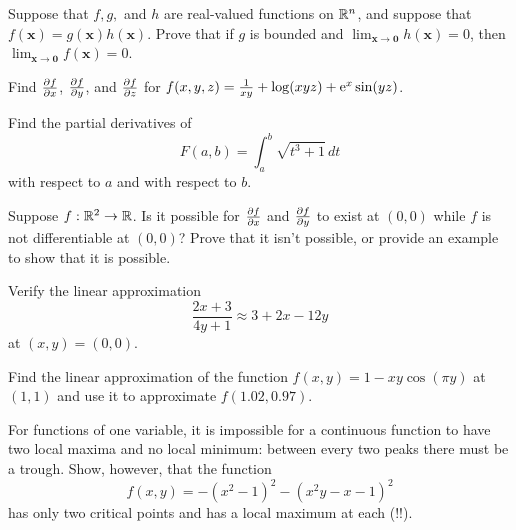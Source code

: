 \documentclass{watsonbook}
\begin{document}
\begin{aexercise}
  Suppose that $f,g,$ and $h$ are real-valued functions on $\mathbb{R}^n$, and
  suppose that $f(\mathbf{x}) = g(\mathbf{x})h(\mathbf{x})$. Prove
  that if $g$ is bounded and
  $\lim_{\mathbf{x}\to \mathbf{0}}h(\mathbf{x}) = 0$, then
  $\lim_{\mathbf{x}\to \mathbf{0}}f(\mathbf{x}) = 0$.
\end{aexercise}


\begin{aexercise}
  Find $\frac{\partial f}{\partial x}$, $\frac{\partial f}{\partial y}$, and $\frac{\partial f}{\partial z}$ for
  $f(x,y,z) = \frac{1}{xy} + \log(xyz) + \operatorname{e}^x\sin(y z) $.
\end{aexercise}

\begin{aexercise}
  Find the partial derivatives of
  \[
    F(a,b) = \int_a^b \sqrt{t^3+1}\,dt
  \]
  with respect to $a$ and with respect to $b$.
\end{aexercise}

\begin{aexercise}
  Suppose $f:\mathbb{R}^2 \to \mathbb{R}$. Is it possible for $\frac{\partial f}{\partial x}$ and
  $\frac{\partial f}{\partial y}$ to exist at $(0,0)$ while $f$ is not differentiable at
  $(0,0)$?  Prove that it isn't possible, or provide an example to
  show that it is possible.
\end{aexercise}


\begin{aexercise}
  Verify the linear approximation
  \[
    \frac{2x+3}{4y+1} \approx 3 + 2x - 12y
  \]
  at $(x,y) = (0,0)$.
\end{aexercise}

\begin{aexercise}
  Find the linear approximation of the function
  $f(x,y) = 1-xy\cos(\pi y)$ at $(1,1)$ and use it to approximate
  $f(1.02,0.97)$.
\end{aexercise}


\begin{aexercise}
  For functions of one variable, it is impossible for a continuous
  function to have two local maxima and no local minimum: between
  every two peaks there must be a trough. Show, however, that the
  function
  \[
    f(x,y) = -(x^2-1)^2-(x^2y-x-1)^2
  \]
  has only two critical points and has a local maximum at each (!!). 
\end{aexercise}
\end{document}
